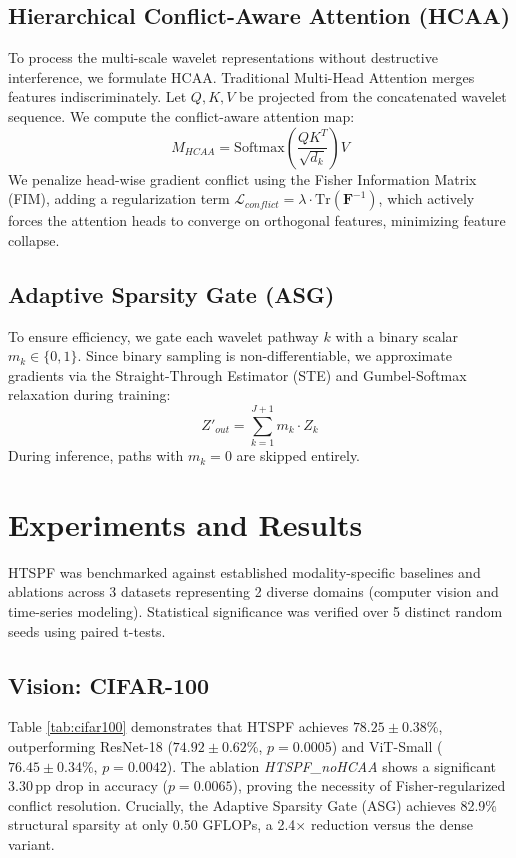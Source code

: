 \documentclass[journal]{IEEEtran}
\begin{document}
\subsection{Hierarchical Conflict-Aware Attention (HCAA)}
To process the multi-scale wavelet representations without destructive interference, we formulate HCAA. Traditional Multi-Head Attention merges features indiscriminately. Let $Q, K, V$ be projected from the concatenated wavelet sequence. We compute the conflict-aware attention map:
\begin{equation}
    M_{HCAA} = \text{Softmax}\left( \frac{Q K^T}{\sqrt{d_k}} \right) V
\end{equation}
We penalize head-wise gradient conflict using the Fisher Information Matrix (FIM), adding a regularization term $\mathcal{L}_{conflict} = \lambda \cdot \text{Tr}(\mathbf{F}^{-1})$, which actively forces the attention heads to converge on orthogonal features, minimizing feature collapse.

\subsection{Adaptive Sparsity Gate (ASG)}
To ensure efficiency, we gate each wavelet pathway $k$ with a binary scalar $m_k \in \{0, 1\}$. Since binary sampling is non-differentiable, we approximate gradients via the Straight-Through Estimator (STE) and Gumbel-Softmax relaxation during training:
\begin{equation}
    Z'_{out} = \sum_{k=1}^{J+1} m_k \cdot Z_k
\end{equation}
During inference, paths with $m_k = 0$ are skipped entirely.

\section{Experiments and Results}
HTSPF was benchmarked against established modality-specific baselines and ablations across 3 datasets representing 2 diverse domains (computer vision and time-series modeling). Statistical significance was verified over 5 distinct random seeds using paired t-tests.

\subsection{Vision: CIFAR-100}
Table \ref{tab:cifar100} demonstrates that HTSPF achieves $78.25 \pm 0.38\%$, outperforming ResNet-18 ($74.92 \pm 0.62\%$, $p=0.0005$) and ViT-Small ($76.45 \pm 0.34\%$, $p=0.0042$). The ablation \textit{HTSPF\_noHCAA} shows a significant 3.30\,pp drop in accuracy ($p=0.0065$), proving the necessity of Fisher-regularized conflict resolution. Crucially, the Adaptive Sparsity Gate (ASG) achieves 82.9\% structural sparsity at only 0.50 GFLOPs, a 2.4$\times$ reduction versus the dense variant.
\end{document}
